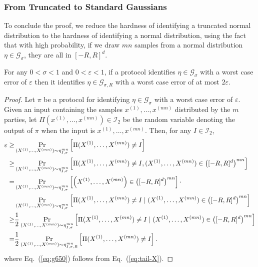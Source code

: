 \documentclass[final, 12pt]{colt2018}
\renewcommand{\eqref}[1]{Eq.~(\ref{#1})}
\begin{document}
\subsubsection{From Truncated to Standard Gaussians} \label{sec:gau-trun-std}

To conclude the proof, we reduce the hardness of identifying a truncated normal distribution to the hardness of identifying a normal distribution, using the fact that with high probability, if we draw $mn$ samples from a normal distribution $\eta \in \mathcal{G}_\sigma$, they are all in $[-R,R]^d$.

\begin{lemma} \label{lem:trunc-to-no}
For any $0 < \sigma < 1$ and $0 < \varepsilon < 1$, if a protocol identifies $\eta \in \mathcal{G}_\sigma$ with a worst case error of $\varepsilon$ then it identifies $\eta \in \mathcal{G}_{\sigma,R}$ with a worst case error of at most $2 \varepsilon$.
\end{lemma}

\begin{proof}
Let $\pi$ be a protocol for identifying $\eta \in \mathcal{G}_\sigma$ with a worst case error of $\varepsilon$. Given an input containing the samples $x^{(1)},\dots,x^{(mn)}$ distributed by the $m$ parties, let $\Pi(x^{(1)},\dots,x^{(mn)}) \in \mathcal{I}_2$ be the random variable denoting the output of $\pi$ when the input is $x^{(1)},\dots,x^{(mn)}$. Then, for any $I \in \mathcal{I}_2$,
\begin{align}
\varepsilon
\ge& \Pr_{(X^{(1)},\dots,X^{(mn)}) \sim \eta_{I,\sigma}^{mn}} \left[ \Pi(X^{(1)},\dots,X^{(mn)}) \ne I \right] \notag \\
\ge& \Pr_{(X^{(1)},\dots,X^{(mn)}) \sim \eta_{I,\sigma}^{mn}} \left[ \Pi(X^{(1)},\dots,X^{(mn)}) \ne I , (X^{(1)},\dots,X^{(mn)}) \in \left( [-R,R]^d \right)^{mn} \right] \notag \\
=& \Pr_{(X^{(1)},\dots,X^{(mn)}) \sim \eta_{I,\sigma}^{mn}} \left[\left(X^{(1)},\dots,X^{(mn)}\right) \in \left( [-R,R]^d \right)^{mn}\right] \cdot \notag \\
& \Pr_{(X^{(1)},\dots,X^{(mn)}) \sim \eta_{I,\sigma}^{mn}} \left[ \Pi(X^{(1)},\dots,X^{(mn)}) \ne I \mid (X^{(1)},\dots,X^{(mn)}) \in \left( [-R,R]^d \right)^{mn} \right] \notag \\
\ge& \frac{1}{2} \Pr_{(X^{(1)},\dots,X^{(mn)}) \sim \eta_{I,\sigma}^{mn}} \left[ \Pi(X^{(1)},\dots,X^{(mn)}) \ne I \mid (X^{(1)},\dots,X^{(mn)}) \in \left( [-R,R]^d \right)^{mn} \right] \label{eq:g650}\\
=& \frac{1}{2} \Pr_{(X^{(1)},\dots,X^{(mn)}) \sim \eta_{I,\sigma,R}^{mn}} \left[ \Pi(X^{(1)},\dots,X^{(mn)}) \ne I \right].
\end{align}
where \eqref{eq:g650} follows from \eqref{eq:tail-X}.
\end{proof}
\end{document}

